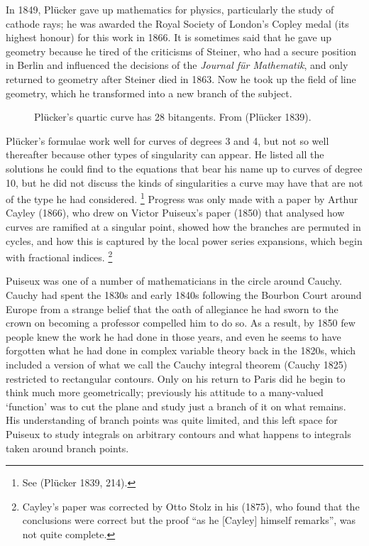 In 1849, Pl\"ucker gave up mathematics for physics, particularly the study
of cathode rays; he was awarded the Royal Society of London's Copley
medal
%
(its highest honour) for this work in 1866. It is sometimes said
that he gave up geometry because he tired of the criticisms of Steiner,
%
who had a secure position in Berlin and influenced the decisions of the
%
\emph{Journal f\"ur Mathematik}, and only returned to geometry after
Steiner died in 1863. Now he took up  the field of line geometry,
%
 which
he transformed into a new branch of the subject.

\begin{figure}
\caption{Pl\"ucker's quartic curve has 28 bitangents. From (Pl\"ucker
1839).}
      \label{fig28bitangents}
\end{figure}

Pl\"ucker's formulae work well for curves of degrees 3 and 4,  but not so
well thereafter because other types of singularity
%
can appear.   He listed
all the solutions he could find to the equations that bear his name up to
curves of degree 10, but he did not discuss the kinds of singularities a
curve may have that are not of the type he had considered.%
%
\footnote{See (Pl\"ucker 1839, 214).}  
%
Progress was only made with a paper by Arthur
Cayley
%
(1866), who drew on Victor Puiseux's
%
paper (1850) that analysed
how curves are ramified at a singular point,  showed how the branches are
%
permuted in cycles, and how this is captured by the local power series
%
expansions, which begin with fractional indices.%
%
%
\footnote{Cayley's paper
was corrected by Otto Stolz
%
in his (1875), who found that the conclusions
were correct but the proof ``as he [Cayley] himself remarks'', was not
quite complete.}

Puiseux was one of a number of mathematicians in the circle around
%
Cau\-chy. Cauchy had spent the 1830s and early 1840s following the
Bourbon Court around Europe from a strange belief that the oath of
allegiance he had sworn to the crown on becoming a professor compelled
him to do so. As a result, by 1850 few people knew the work he had done
in those years, and even he seems to have forgotten what he had done
in complex variable theory back in the 1820s, which included a version
of what we call the Cauchy integral theorem
%
%
(Cauchy 1825) restricted
to rectangular contours. Only on his return to Paris did he begin to
think much more geometrically; previously his attitude to a many-valued
`function' was to cut the plane and study just a branch of it on what
remains. His understanding of branch points was quite limited, and this
left space for Puiseux to study integrals on arbitrary contours   and
what happens to integrals taken around branch points.

